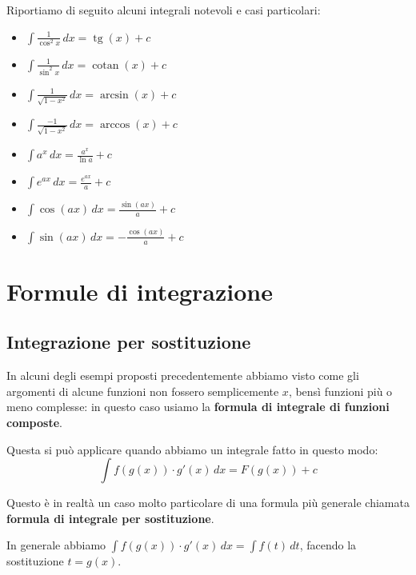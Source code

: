 \documentclass[12pt]{report}
\begin{document}
	Riportiamo di seguito alcuni integrali notevoli e casi particolari:
	\begin{itemize}
		
		\item $\int \frac{1}{\cos^2 x} \, dx = \operatorname{tg}(x) + c$
		
		\item $\int \frac{1}{\sin^2 x} \, dx = \operatorname{cotan}(x) + c$
		
		\item $\int \frac{1}{\sqrt{1-x^2}} \, dx = \arcsin(x) + c$
		
		\item $\int \frac{-1}{\sqrt{1-x^2}} \, dx = \arccos(x) + c$
		
		\item $\int a^x \, dx = \frac{a^x}{\ln a} + c$
		
		\item $\int e^{ax} \, dx = \frac{e^{ax}}{a} + c$
		
		\item $\int \cos(ax) \, dx = \frac{\sin(ax)}{a} + c$
		
		\item $\int \sin(ax) \, dx = -\frac{\cos(ax)}{a} + c$
		
	\end{itemize}
	
	\section{Formule di integrazione}
	
	\subsection{Integrazione per sostituzione}
	
	In alcuni degli esempi proposti precedentemente abbiamo visto come gli argomenti di alcune funzioni non fossero semplicemente $x$, bensì funzioni più o meno complesse: in questo caso usiamo la \textbf{formula di integrale di funzioni composte}.
	
	Questa si può applicare quando abbiamo un integrale fatto in questo modo:
	\[
	\int f(g(x)) \cdot g'(x) \, dx = F(g(x)) + c
	\]
	
	Questo è in realtà un caso molto particolare di una formula più generale chiamata \textbf{formula di integrale per sostituzione}.
	
	In generale abbiamo $\int f(g(x)) \cdot g'(x) \, dx = \int f(t) \, dt$, facendo la sostituzione $t = g(x)$.
	
\end{document}

